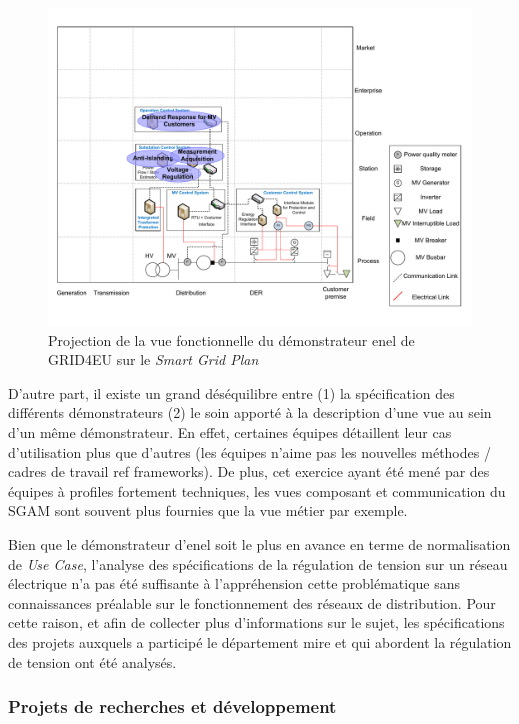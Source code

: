 \begin{figure}[!ht]
    \begin{center}
     \includegraphics[trim=0cm 1cm 0cm 1cm, width=1\textwidth]{figures/4_demarche/enel.pdf}
    \end{center}
    \caption{Projection de la vue fonctionnelle du démonstrateur \gls{enel} de
GRID4EU sur le \textit{Smart Grid Plan}} \label{fig:enel_sgplan}
\end{figure}

D'autre part, il existe un grand déséquilibre entre (1) la spécification des
différents démonstrateurs (2) le soin apporté à la description d'une vue au sein
d'un même démonstrateur. En effet, certaines équipes détaillent leur cas
d'utilisation plus que d'autres (les équipes n'aime pas les nouvelles méthodes /
cadres de travail ref frameworks). De plus, cet exercice ayant été mené par des
équipes à profiles fortement techniques, les vues composant et communication du
SGAM sont souvent plus fournies que la vue métier par exemple.

Bien que le démonstrateur d'\gls{enel} soit le plus en avance en terme de
normalisation de \textit{Use Case}, l'analyse des spécifications de la
régulation de tension sur un réseau électrique n'a pas été suffisante à
l'appréhension cette problématique sans connaissances préalable sur le
fonctionnement des réseaux de distribution. Pour cette raison, et afin de
collecter plus d'informations sur le sujet, les spécifications des projets
auxquels a participé le département \gls{mire} et qui abordent la régulation de
tension ont été analysés.


\subsubsection{Projets de recherches et développement}

